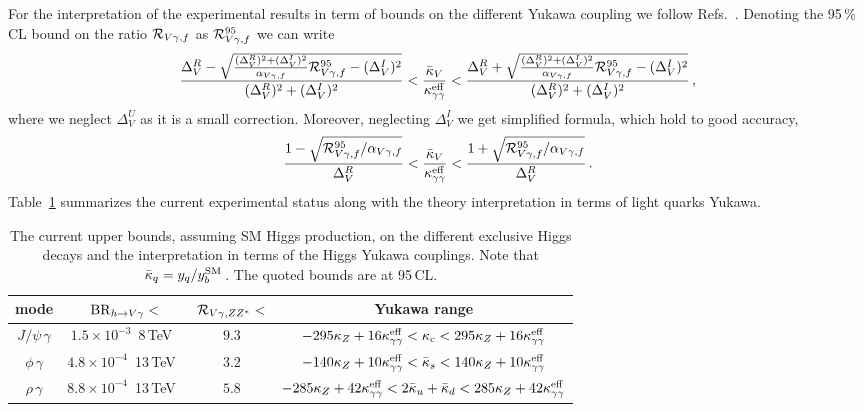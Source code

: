\documentclass[../report.tex]{subfiles}
\begin{document}
For the interpretation of the experimental results in term of bounds on the different Yukawa coupling we follow Refs.~\cite{Perez:2015aoa,Perez:2015lra}. 
Denoting the 95\,\%\,CL bound on the ratio $\mathcal{R}_{V\gamma,f}$ as $\mathcal{R}_{V\gamma,f}^{95}$ we can write 
%
\begin{align}
	\frac{\Delta^R_V - \sqrt{  \frac{(\Delta^R_V)^2 + (\Delta^I_V)^2    }{\alpha_{V\gamma,f}} \mathcal{R}_{V\gamma,f}^{95}   - (\Delta^I_V)^2 } }{ (\Delta^R_V)^2 + (\Delta^I_V)^2 } 
	< \frac{\bar{\kappa}_V}{\kappa^{\rm eff}_{\gamma\gamma}} < 
	\frac{\Delta^R_V + \sqrt{  \frac{(\Delta^R_V)^2 + (\Delta^I_V)^2    }{\alpha_{V\gamma,f}} \mathcal{R}_{V\gamma,f}^{95}   - (\Delta^I_V)^2 } }{ (\Delta^R_V)^2 + (\Delta^I_V)^2 }  \, ,
\end{align}
%
where we neglect $\Delta^U_V$ as it is a small correction. 
Moreover, neglecting $\Delta^I_V$ we get simplified formula, which hold to good accuracy, 
%
\begin{align}
	\label{eq:Rsimp}
	\frac{1 - \sqrt{  \mathcal{R}_{V\gamma,f}^{95}/\alpha_{V\gamma,f} } }{ \Delta^R_V} 
	< \frac{\bar{\kappa}_V}{\kappa^{\rm eff}_{\gamma\gamma}} < 
	\frac{1 + \sqrt{  \mathcal{R}_{V\gamma,f}^{95}/\alpha_{V\gamma,f} } }{ \Delta^R_V}  \, .
\end{align}
%
Table~\ref{tab:hexclusive} summarizes the current experimental status along with the theory interpretation in terms of light quarks Yukawa.  
\begin{table}[t]
\begin{center}
\begin{tabular}{|c|c|c|c|}
\hline
mode & ${\rm BR}_{h\to V\gamma}<$ & $\mathcal{R}_{V\gamma,ZZ^*}<$ &Yukawa range  \\
\hline\hline 
$J/\psi\,\gamma$  &
$1.5\times 10^{-3}$\, 8\,TeV~\cite{Aad:2015sda,Khachatryan:2015lga} & 
$9.3$ &
$-295\kappa_Z + 16\kappa^{\rm eff}_{\gamma\gamma} < \kappa_c < 295\kappa_Z + 16\kappa^{\rm eff}_{\gamma\gamma} $\\
\hline
$\phi\,\gamma$ &
$4.8 \times 10^{-4}$\, 13\,TeV~\cite{Aaboud:2016rug,Aaboud:2017xnb} & 
$3.2$ &
$-140\kappa_Z + 10\kappa^{\rm eff}_{\gamma\gamma} < \bar{\kappa}_s < 140\kappa_Z + 10\kappa^{\rm eff}_{\gamma\gamma} $\\
\hline
$\rho\,\gamma$ &
$8.8 \times 10^{-4}$\, 13\,TeV~\cite{Aaboud:2017xnb} & 
$5.8$ &
$-285\kappa_Z + 42\kappa^{\rm eff}_{\gamma\gamma} < 2\bar{\kappa}_u + \bar{\kappa}_d < 285\kappa_Z + 42\kappa^{\rm eff}_{\gamma\gamma} $\\
\hline\hline
\end{tabular}
\end{center}
\caption{The current upper bounds, assuming SM Higgs production, on the different exclusive Higgs decays and the interpretation in terms of the Higgs Yukawa couplings. Note that $\bar{\kappa}_q = y_q/y^{\rm SM}_b\,$. The quoted bounds are at 95\,CL. }
\label{tab:hexclusive}
\end{table}%
\end{document}
